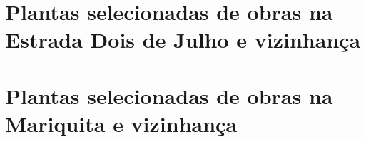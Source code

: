 \begin{anexosenv}

\chapter{Plantas selecionadas de obras na Estrada Dois de Julho e vizinhança}


\chapter{Plantas selecionadas de obras na Mariquita e vizinhança}



\end{anexosenv}
